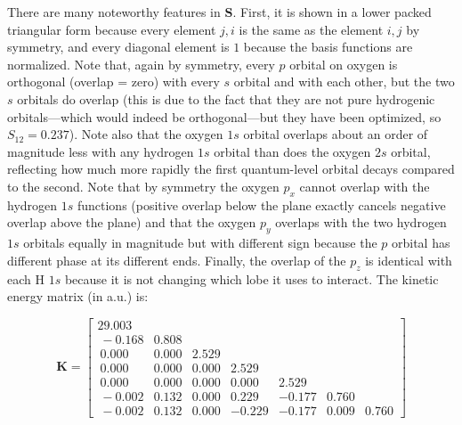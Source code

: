 \documentclass[
  9pt,
]{extbook}
\theoremstyle{definition}
\theoremstyle{definition}
\theoremstyle{definition}
\theoremstyle{remark}
\begin{document}
There are many noteworthy features in \(\mathbf{S}\). First, it is shown in a lower packed triangular form because every element \(j,i\) is the same as the element \(i,j\) by symmetry, and every diagonal element is \(1\) because the basis functions are normalized. Note that, again by symmetry, every \(p\) orbital on oxygen is orthogonal (overlap = zero) with every \(s\) orbital and with each other, but the two \(s\) orbitals do overlap (this is due to the fact that they are not pure hydrogenic orbitals---which would indeed be orthogonal---but they have been optimized, so \(S_{12} = 0.237\)). Note also that the oxygen \(1s\) orbital overlaps about an order of magnitude less with any hydrogen \(1s\) orbital than does the oxygen \(2s\) orbital, reflecting how much more rapidly the first quantum-level orbital decays compared to the second. Note that by symmetry the oxygen \(p_x\) cannot overlap with the hydrogen \(1s\) functions (positive overlap below the plane exactly cancels negative overlap above the plane) and that the oxygen \(p_y\) overlaps with the two hydrogen \(1s\) orbitals equally in magnitude but with different sign because the \(p\) orbital has different phase at its different ends. Finally, the overlap of the \(p_z\) is identical with each H \(1s\) because it is not changing which lobe it uses to interact. The kinetic energy matrix (in a.u.) is:

\begin{equation}
\mathbf{K}=
\begin{bmatrix}
29.003 & & & & & & \\\ 
-0.168 & 0.808 & & & & &  \\\
0.000 & 0.000 & 2.529 & & & & \\\
0.000 & 0.000 & 0.000 & 2.529 & & & \\\
0.000 & 0.000 & 0.000 & 0.000 & 2.529 & & \\\
-0.002 & 0.132 & 0.000 & 0.229 & -0.177 & 0.760 & \\\
-0.002 & 0.132 & 0.000 & -0.229 & -0.177 & 0.009 & 0.760
\end{bmatrix}
\label{eq:kmatrix}
\end{equation}
\end{document}

